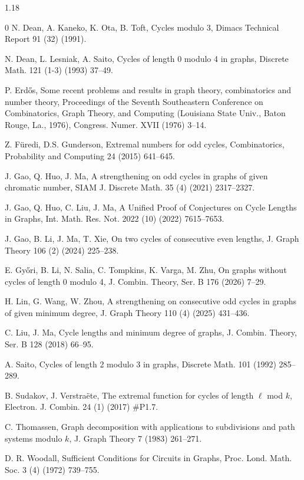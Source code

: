 \documentclass[10pt]{article}
\begin{document}
\begin{spacing}{1.18}
\begin{thebibliography}{0}
N. Dean, A. Kaneko, K. Ota, B. Toft,
Cycles modulo 3,
Dimacs Technical Report 91 (32) (1991).


N. Dean, L. Lesniak, A. Saito,
Cycles of length 0 modulo 4 in graphs,
Discrete Math. 121 (1-3) (1993) 37--49.

P. Erd\H{o}s, 
Some recent problems and results in graph theory, combinatorics and number theory,
Proceedings of the Seventh Southeastern Conference on Combinatorics, Graph Theory, and Computing (Louisiana State Univ., Baton Rouge, La., 1976), 
Congress. Numer. XVII (1976) 3--14.

Z. F\"{u}redi, D.S. Gunderson, 
Extremal numbers for odd cycles, 
Combinatorics, Probability and Computing 24 (2015) 641--645.

J. Gao, Q. Huo, J. Ma, 
A strengthening on odd cycles in graphs of given chromatic number, 
SIAM J. Discrete Math. 35 (4) (2021) 2317--2327.

J. Gao, Q. Huo, C. Liu, J. Ma, 
A Unified Proof of Conjectures on Cycle Lengths in Graphs, 
Int. Math. Res. Not. 2022 (10) (2022) 7615--7653.

J. Gao, B. Li, J. Ma, T. Xie,
On two cycles of consecutive even lengths,
J. Graph Theory 106 (2) (2024) 225--238.

E. Gy\H{o}ri, B. Li, N. Salia, C. Tompkins, K. Varga, M. Zhu,
On graphs without cycles of length 0 modulo 4,
J. Combin. Theory, Ser. B 176 (2026) 7--29.

H. Lin, G. Wang, W. Zhou,
A strengthening on consecutive odd cycles in graphs of given minimum degree,
J. Graph Theory 110 (4) (2025) 431--436.


C. Liu, J. Ma,
Cycle lengths and minimum degree of graphs,
J. Combin. Theory, Ser. B 128 (2018) 66--95.

A. Saito, 
Cycles of length 2 modulo 3 in graphs, 
Discrete Math. 101 (1992) 285--289.

B. Sudakov, J. Verstra\"{e}te,
The extremal function for cycles of length $\ell$ mod $k$,
Electron. J. Combin. 24 (1) (2017) \#P1.7.

C. Thomassen, 
Graph decomposition with applications to subdivisions and path systems modulo $k$,
J. Graph Theory 7 (1983) 261--271.

D. R. Woodall,
Sufficient Conditions for Circuits in Graphs,
Proc. Lond. Math. Soc. 3 (4) (1972) 739--755.

\end{thebibliography}



\end{spacing}
\end{document}
